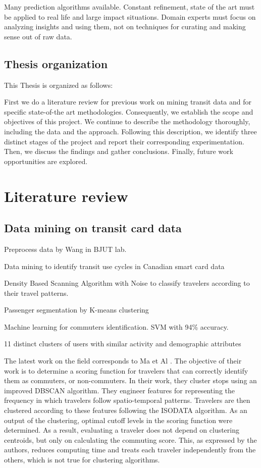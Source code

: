 \documentclass{article}
\begin{document}
Many prediction algorithms available. Constant refinement, state of the art must be applied to real life and large impact situations. Domain experts must focus on analyzing insights and using them, not on techniques for curating and making sense out of raw data. 

\subsection{Thesis organization}
This Thesis is organized as follows:

First we do a literature review for previous work on mining transit data and for specific state-of-the art methodologies. Consequently, we establish the scope and objectives of this project. We continue to describe the methodology thoroughly, including the data and the approach. Following this description, we identify three distinct stages of the project and report their corresponding experimentation. Then, we discuss the findings and gather conclusions. Finally, future work opportunities are explored. 


\newpage
\section{Literature review}

\subsection{Data mining on transit card data}
Preprocess data by Wang in BJUT lab. \cite{wang2014research}

Data mining to identify transit use cycles in Canadian smart card data \cite{morency2007measuring}

Density Based Scanning Algorithm with Noise to classify travelers according to their travel patterns.  \cite{ma2013mining}

Passenger segmentation by K-means clustering \cite{bhaskar2015passenger}

Machine learning for commuters identification. SVM with 94\% accuracy. \cite{tu2016impact}

11 distinct clusters of users with similar activity and demographic attributes \cite{langlois2016inferring}

The latest work on the field corresponds to Ma et Al \cite{ma2017understanding}. The objective of their work is to determine a scoring function for travelers that can correctly identify them as commuters, or non-commuters. In their work, they cluster stops using an improved DBSCAN algorithm. They engineer features for representing the frequency in which travelers follow spatio-temporal patterns. Travelers are then clustered according to these features following the ISODATA algorithm. As an output of the clustering, optimal cutoff levels in the scoring function were determined. As a result, evaluating a traveler does not depend on clustering centroids, but only on calculating the commuting score. This, as expressed by the authors, reduces computing time and treats each traveler independently from the others, which is not true for clustering algorithms.
\end{document}
